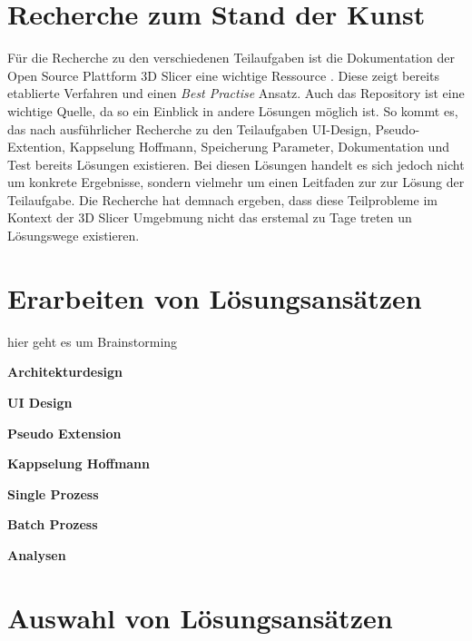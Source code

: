 \section{Recherche zum Stand der Kunst}
\label{sec:recherche} Für die Recherche zu den verschiedenen Teilaufgaben ist die 
Dokumentation der Open Source Plattform 3D Slicer eine wichtige Ressource 
\cite[vgl.][]{slicer2024}. Diese zeigt bereits etablierte Verfahren und einen
\textit{Best Practise} Ansatz. Auch das \citet{extensionsIndex2024} Repository ist eine
wichtige Quelle, da so ein Einblick in andere Lösungen möglich ist. So kommt es, das nach
ausführlicher Recherche zu den Teilaufgaben UI-Design, Pseudo-Extention, Kappselung Hoffmann,
Speicherung Parameter, Dokumentation und Test bereits Lösungen existieren. Bei diesen Lösungen
handelt es sich jedoch nicht um konkrete Ergebnisse, sondern vielmehr um einen Leitfaden
zur zur Lösung der Teilaufgabe. Die Recherche hat demnach ergeben, dass diese Teilprobleme im
Kontext der 3D Slicer Umgebmung nicht das erstemal zu Tage treten un Lösungswege existieren.

\section{Erarbeiten von Lösungsansätzen}
\label{sec:lösungsansätze} hier geht es um Brainstorming

\textbf{Architekturdesign}

\textbf{UI Design}

\textbf{Pseudo Extension}

\textbf{Kappselung Hoffmann}

\textbf{Single Prozess}

\textbf{Batch Prozess}

\textbf{Analysen}

\section{Auswahl von Lösungsansätzen}